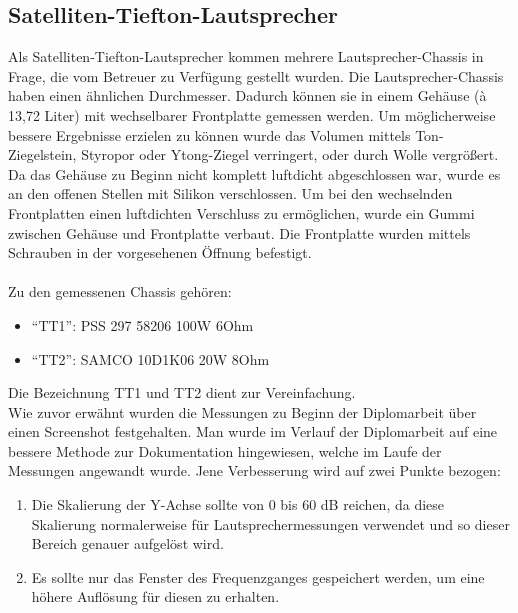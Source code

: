\subsection*{Satelliten-Tiefton-Lautsprecher} \label{4.2.4}
Als Satelliten-Tiefton-Lautsprecher kommen mehrere Lautsprecher-Chassis in Frage, die vom Betreuer zu Verfügung gestellt wurden.
Die Lautsprecher-Chassis haben einen ähnlichen Durchmesser.
Dadurch können sie in einem Gehäuse (à 13,72 Liter) mit wechselbarer Frontplatte gemessen werden.
Um möglicherweise bessere Ergebnisse erzielen zu können wurde das Volumen mittels Ton-Ziegelstein, Styropor oder Ytong-Ziegel verringert, oder durch Wolle vergrößert.\\
Da das Gehäuse zu Beginn nicht komplett luftdicht abgeschlossen war, wurde es an den offenen Stellen mit Silikon verschlossen.
Um bei den wechselnden Frontplatten einen luftdichten Verschluss zu ermöglichen, wurde ein Gummi zwischen Gehäuse und Frontplatte verbaut.
Die Frontplatte wurden mittels Schrauben in der vorgesehenen Öffnung befestigt.\\ \\
Zu den gemessenen Chassis gehören:
\begin{itemize}
	\item \enquote{TT1}: PSS 297 58206 100W 6Ohm
	\item \enquote{TT2}: SAMCO 10D1K06 20W 8Ohm
\end{itemize}
Die Bezeichnung TT1 und TT2 dient zur Vereinfachung.\\

Wie zuvor erwähnt wurden die Messungen zu Beginn der Diplomarbeit über einen Screenshot festgehalten.
Man wurde im Verlauf der Diplomarbeit auf eine bessere Methode zur Dokumentation hingewiesen, welche im Laufe der Messungen angewandt wurde.
Jene Verbesserung wird auf zwei Punkte bezogen:\\
\begin{enumerate}
	\item Die Skalierung der Y-Achse sollte von 0 bis 60 dB reichen, da diese Skalierung normalerweise für Lautsprechermessungen verwendet und so dieser Bereich genauer aufgelöst wird.
	\item Es sollte nur das Fenster des Frequenzganges gespeichert werden, um eine höhere Auflösung für diesen zu erhalten.
\end{enumerate}

